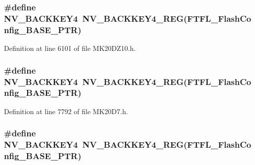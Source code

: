 \subsubsection[{\texorpdfstring{N\+V\+\_\+\+B\+A\+C\+K\+K\+E\+Y4}{NV_BACKKEY4}}]{\setlength{\rightskip}{0pt plus 5cm}\#define N\+V\+\_\+\+B\+A\+C\+K\+K\+E\+Y4~{\bf N\+V\+\_\+\+B\+A\+C\+K\+K\+E\+Y4\+\_\+\+R\+EG}({\bf F\+T\+F\+L\+\_\+\+Flash\+Config\+\_\+\+B\+A\+S\+E\+\_\+\+P\+TR})}\hypertarget{group___n_v___register___accessor___macros_ga5f7ba38a88074b8b658dfe992c73482c}{}\label{group___n_v___register___accessor___macros_ga5f7ba38a88074b8b658dfe992c73482c}


Definition at line 6101 of file M\+K20\+D\+Z10.\+h.

\subsubsection[{\texorpdfstring{N\+V\+\_\+\+B\+A\+C\+K\+K\+E\+Y4}{NV_BACKKEY4}}]{\setlength{\rightskip}{0pt plus 5cm}\#define N\+V\+\_\+\+B\+A\+C\+K\+K\+E\+Y4~{\bf N\+V\+\_\+\+B\+A\+C\+K\+K\+E\+Y4\+\_\+\+R\+EG}({\bf F\+T\+F\+L\+\_\+\+Flash\+Config\+\_\+\+B\+A\+S\+E\+\_\+\+P\+TR})}\hypertarget{group___n_v___register___accessor___macros_ga5f7ba38a88074b8b658dfe992c73482c}{}\label{group___n_v___register___accessor___macros_ga5f7ba38a88074b8b658dfe992c73482c}


Definition at line 7792 of file M\+K20\+D7.\+h.

\subsubsection[{\texorpdfstring{N\+V\+\_\+\+B\+A\+C\+K\+K\+E\+Y4}{NV_BACKKEY4}}]{\setlength{\rightskip}{0pt plus 5cm}\#define N\+V\+\_\+\+B\+A\+C\+K\+K\+E\+Y4~{\bf N\+V\+\_\+\+B\+A\+C\+K\+K\+E\+Y4\+\_\+\+R\+EG}({\bf F\+T\+F\+L\+\_\+\+Flash\+Config\+\_\+\+B\+A\+S\+E\+\_\+\+P\+TR})}\hypertarget{group___n_v___register___accessor___macros_ga5f7ba38a88074b8b658dfe992c73482c}{}\label{group___n_v___register___accessor___macros_ga5f7ba38a88074b8b658dfe992c73482c}


